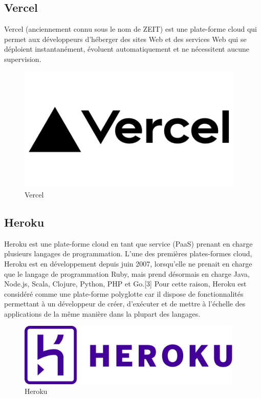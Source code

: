 \subsection{Vercel}

Vercel (anciennement connu sous le nom de ZEIT) est une plate-forme cloud qui permet aux développeurs d'héberger des sites Web et des services Web qui se déploient instantanément, évoluent automatiquement et ne nécessitent aucune supervision.

\begin{figure}[!h]
\begin{center}
\includegraphics[height=6cm]{vercel.png}
\end{center}
\caption{Vercel}
\end{figure}


\subsection{Heroku}

Heroku est une plate-forme cloud en tant que service (PaaS) prenant en charge plusieurs langages de programmation. L'une des premières plates-formes cloud, Heroku est en développement depuis juin 2007, lorsqu'elle ne prenait en charge que le langage de programmation Ruby, mais prend désormais en charge Java, Node.js, Scala, Clojure, Python, PHP et Go.[3] Pour cette raison, Heroku est considéré comme une plate-forme polyglotte car il dispose de fonctionnalités permettant à un développeur de créer, d'exécuter et de mettre à l'échelle des applications de la même manière dans la plupart des langages.


\begin{figure}[!h]
\begin{center}
\includegraphics[height=3cm]{heroku.svg.png}
\end{center}
\caption{Heroku}
\end{figure}


